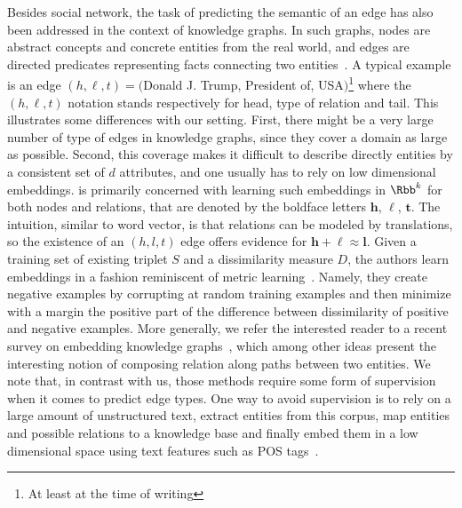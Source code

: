 Besides social network, the task of predicting the semantic of an edge has also been addressed in
the context of knowledge graphs. In such graphs, nodes are abstract concepts and concrete entities
from the real world, and edges are directed predicates representing facts connecting two
entities~\autocite{KnowledgeGraphSurvey16}. A typical example is an edge $(h, \ell, t) =
($\textsf{Donald J. Trump}, \textsf{President of}, \textsf{USA}$)$\footnote{At least at the time of
writing} where the $(h, \ell, t)$ notation stands respectively for head, type of relation and tail.
This illustrates some differences with our setting. First, there might be a very large number of
type of edges in knowledge graphs, since they cover a domain as large as possible. Second, this
coverage makes it difficult to describe directly entities by a consistent set of $d$ attributes, and
one usually has to rely on low dimensional embeddings. \autocite{transE13} is primarily concerned
with learning such embeddings in $\Rbb^k$ for both nodes and relations, that are denoted by the
boldface letters $\bm{h}$, $\bm{\ell}$, $\bm{t}$. The intuition, similar to word vector, is that
relations can be modeled by translations, so the existence of an $(h,l,t)$ edge offers evidence for
$\bm{h} + \bm{\ell} \approx \bm{l}$. Given a training set of existing triplet $S$ and a
dissimilarity measure $D$, the authors learn embeddings in a fashion reminiscent of metric
learning~\autocite{MetricLearning15}. Namely, they create negative examples by corrupting at random
training examples and then minimize with a margin the positive part of the difference between
dissimilarity of positive and negative examples. More generally, we refer the interested reader to a
recent survey on embedding knowledge graphs~\autocite{KnowledgeGraphSurvey17}, which among other
ideas present the interesting notion of composing relation along paths between two entities. We note
that, in contrast with us, those methods require some form of supervision when it comes to predict
edge types.  One way to avoid supervision is to rely on a large amount of unstructured text, extract
entities from this corpus, map entities and possible relations to a knowledge base and finally embed
them in a low dimensional space using text features such as POS tags~\autocite{Ren2017}.


